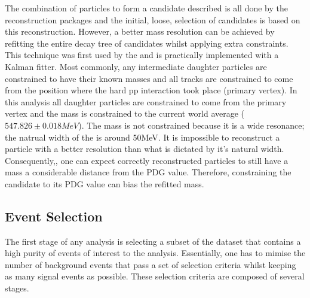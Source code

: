 The combination of particles to form a \Bd candidate described is all done by the \lhcb reconstruction packages and the initial, loose, selection of \Bd candidates is based on this reconstruction. However, a better mass resolution can be achieved by refitting the entire decay tree of \Bd candidates whilst applying extra constraints.  This technique was first used by the \babar and is practically implemented with a Kalman fitter\cite{Hulsbergen:2005pu}.  Most commonly, any intermediate daughter particles are constrained to have their known masses and all tracks are constrained to come from the position where the hard pp interaction took place (primary vertex).  In this analysis all daughter particles are constrained to come from the primary vertex and the \etaz mass is constrained to the current world average ($547.826\pm0.018MeV$)\cite{PDG2014}.  The \Kstar mass is not constrained because it is a wide resonance; the natrual width of the \Kstar is around 50MeV.  It is impossible to reconstruct a particle with a better resolution than what is dictated by it's natural width.  Consequently,, one can expect correctly reconstructed \Kstar particles to still have a mass a considerable distance from the PDG value.  Therefore, constraining the \Kstar candidate to its PDG value can bias the refitted \Bd mass.

\subsection{Event Selection}
\label{sec:Selection}

The first stage of any analysis is selecting a subset of the \lhcb dataset that contains a high purity of events of interest to the analysis.  Essentially, one has to mimise the number of background events that pass a set of selection criteria whilst keeping as many signal events as possible. These selection criteria are composed of several stages.

